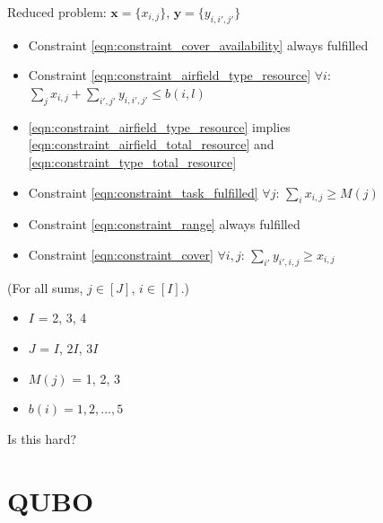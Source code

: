 \documentclass{article}
\begin{document}
\noindent 
Reduced problem:
$\mathbf x = \{x_{i, j}\}$, $\mathbf y = \{y_{i, i' ,j'}\}$
\begin{itemize}
    \item Constraint \eqref{eqn:constraint_cover_availability} always fulfilled
    \item Constraint \eqref{eqn:constraint_airfield_type_resource} $\forall i$: $\sum_j x_{i,j} + \sum_{i', j'} y_{i, i', j'}  \leq b(i,l)$
    \item \eqref{eqn:constraint_airfield_type_resource} implies \eqref{eqn:constraint_airfield_total_resource} and \eqref{eqn:constraint_type_total_resource}
    \item Constraint \eqref{eqn:constraint_task_fulfilled} $\forall j$: $\sum_{i} x_{i, j} \geq M(j)$
    \item Constraint \eqref{eqn:constraint_range} always fulfilled
    \item Constraint \eqref{eqn:constraint_cover} $\forall i, j$: $\sum_{i'} y_{i', i, j} \geq x_{i, j}$
\end{itemize}
(For all sums, $j \in [J]$, $i \in [I]$.)

\begin{itemize}
\item $I$ = 2, 3, 4
\item $J$ = $I$, $2I$, $3I$
\item $M(j)$ = 1, 2, 3
\item $b(i) = 1, 2, \ldots, 5$
\end{itemize}
Is this hard?

\section{QUBO}
\end{document}
